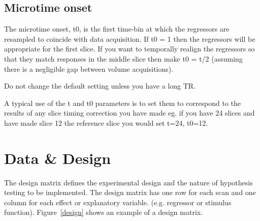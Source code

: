 \subsection{Microtime onset}

The microtime onset, t0, is the first time-bin at which the regressors are resampled to coincide with data acquisition.  If t0 = 1 then the regressors will be appropriate for the first slice.  If you want to temporally realign the regressors so that they match responses in the middle slice then make t0 = t/2 (assuming there is a negligible gap between volume acquisitions).                                           

Do not change the default setting unless you have a long TR. 

A typical use of the t and t0 parameters is to set them to correspond to the results of any slice timing correction you have made eg. if you have 24 slices and have made slice 12 the reference slice you would set t=24, t0=12. 

\section{Data \& Design}

The design matrix defines the experimental design and the nature of hypothesis testing to be implemented.  The design matrix has one row for each scan and one column for each effect or explanatory variable. (e.g. regressor or stimulus function).  Figure~\ref{design} shows an example of a design matrix.

